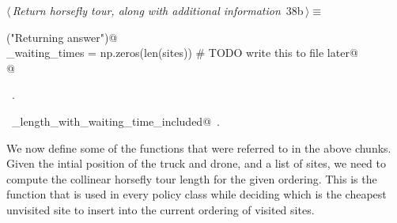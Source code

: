 \documentclass[11.5pt]{report}
\begin{document}
\begin{flushleft} \small\label{scrap50}\raggedright\small
{} $\langle\,${\itshape Return horsefly tour, along with additional information}\nobreak\ {\footnotesize {38b}}$\,\rangle\equiv$
\vspace{-1ex}
\begin{list}{}{} \item
\mbox{}\verb@debug("Returning answer")@\\
\mbox{}\verb@horse_waiting_times = np.zeros(len(sites)) # TODO write this to file later@\\
\mbox{}@\\
\mbox{}\verb@@{\NWsep}
\end{list}
\vspace{-1.5ex}
\footnotesize
\begin{list}{}{\setlength{\itemsep}{-\parsep}\setlength{\itemindent}{-\leftmargin}}
\item \NWtxtMacroRefIn\ .
\item \NWtxtIdentsUsed\nobreak\  \verb@tour_length_with_waiting_time_included@\nobreak\ .
\item{}
\end{list}
\vspace{4ex}
\end{flushleft}

\vspace{-0.8cm}\newchunk We now define some of the functions that were referred to in the above chunks. 
Given the intial position of the truck and drone, and a list of sites, we need to compute 
the collinear horsefly tour length for the given ordering. This is the function that is 
used in every policy class while deciding which is the cheapest unvisited site to insert 
into the current ordering of visited sites. 
\end{document}
